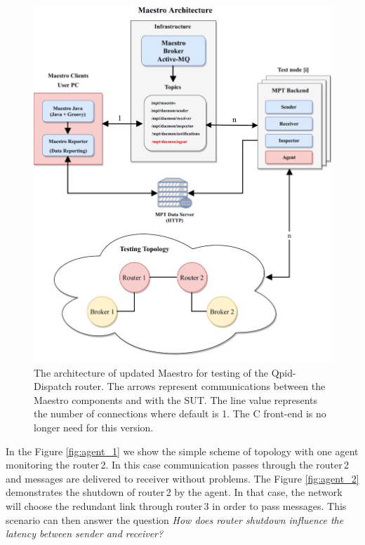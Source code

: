 \begin{figure}[h]
  \centering
  \includegraphics[width=15cm]{obrazky-figures/msg_perf_tool_for_router.pdf}
  \caption{The architecture of updated Maestro for testing of the Qpid-Dispatch router. The arrows represent communications between the Maestro components and with the SUT. The line value represents the number of connections where default is 1. The C front-end is no longer need for this version.}
  \label{fig:msg_perf_tool_update}
\end{figure}

In the Figure \ref{fig:agent_1} we show the simple scheme of topology with one agent monitoring the router\,2. In this case communication passes through the router\,2 and messages are delivered to receiver without problems. The Figure \ref{fig:agent_2} demonstrates the shutdown of router\,2  by the agent. In that case, the network will choose the redundant link through router\,3 in order to pass messages. This scenario can then answer the question \emph{How does router shutdown influence the latency between sender and receiver?}

